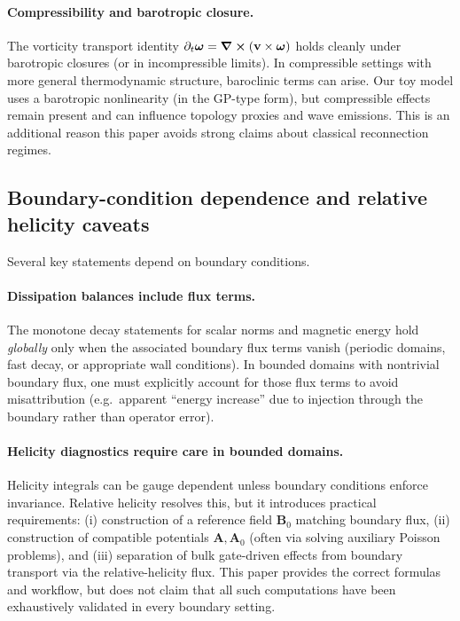 \documentclass[11pt]{article}
\theoremstyle{plain}
\theoremstyle{definition}
\theoremstyle{remark}
\newcommand{\A}{\mathbf{A}}
\newcommand{\B}{\mathbf{B}}
\newcommand{\vfield}{\mathbf{v}}
\newcommand{\omegaV}{\boldsymbol{\omega}}
\begin{document}
\paragraph{Compressibility and barotropic closure.}
The vorticity transport identity $\partial_t\omegaV=\curl(\vfield\times\omegaV)$ holds cleanly under
barotropic closures (or in incompressible limits). In compressible settings with more general
thermodynamic structure, baroclinic terms can arise. Our toy model uses a barotropic nonlinearity (in
the GP-type form), but compressible effects remain present and can influence topology proxies and wave
emissions. This is an additional reason this paper avoids strong claims about classical reconnection
regimes.

\subsection{Boundary-condition dependence and relative helicity caveats}\label{sec:limitations_boundaries}
Several key statements depend on boundary conditions.

\paragraph{Dissipation balances include flux terms.}
The monotone decay statements for scalar norms and magnetic energy hold \emph{globally} only when the
associated boundary flux terms vanish (periodic domains, fast decay, or appropriate wall conditions).
In bounded domains with nontrivial boundary flux, one must explicitly account for those flux terms to
avoid misattribution (e.g.\ apparent ``energy increase'' due to injection through the boundary rather
than operator error).

\paragraph{Helicity diagnostics require care in bounded domains.}
Helicity integrals can be gauge dependent unless boundary conditions enforce invariance. Relative
helicity resolves this, but it introduces practical requirements:
(i) construction of a reference field $\B_0$ matching boundary flux,
(ii) construction of compatible potentials $\A,\A_0$ (often via solving auxiliary Poisson problems),
and (iii) separation of bulk gate-driven effects from boundary transport via the relative-helicity flux.
This paper provides the correct formulas and workflow, but does not claim that all such computations have
been exhaustively validated in every boundary setting.
\end{document}
